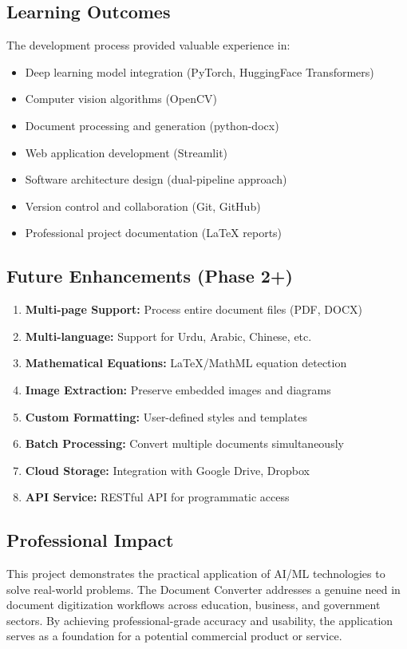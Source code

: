 \documentclass[12pt,a4paper]{article}
\begin{document}
\subsection{Learning Outcomes}
The development process provided valuable experience in:
\begin{itemize}[noitemsep]
    \item Deep learning model integration (PyTorch, HuggingFace Transformers)
    \item Computer vision algorithms (OpenCV)
    \item Document processing and generation (python-docx)
    \item Web application development (Streamlit)
    \item Software architecture design (dual-pipeline approach)
    \item Version control and collaboration (Git, GitHub)
    \item Professional project documentation (LaTeX reports)
\end{itemize}

\subsection{Future Enhancements (Phase 2+)}
\begin{enumerate}
    \item \textbf{Multi-page Support:} Process entire document files (PDF, DOCX)
    \item \textbf{Multi-language:} Support for Urdu, Arabic, Chinese, etc.
    \item \textbf{Mathematical Equations:} LaTeX/MathML equation detection
    \item \textbf{Image Extraction:} Preserve embedded images and diagrams
    \item \textbf{Custom Formatting:} User-defined styles and templates
    \item \textbf{Batch Processing:} Convert multiple documents simultaneously
    \item \textbf{Cloud Storage:} Integration with Google Drive, Dropbox
    \item \textbf{API Service:} RESTful API for programmatic access
\end{enumerate}

\subsection{Professional Impact}
This project demonstrates the practical application of AI/ML technologies to solve real-world problems. The Document Converter addresses a genuine need in document digitization workflows across education, business, and government sectors. By achieving professional-grade accuracy and usability, the application serves as a foundation for a potential commercial product or service.
\end{document}
